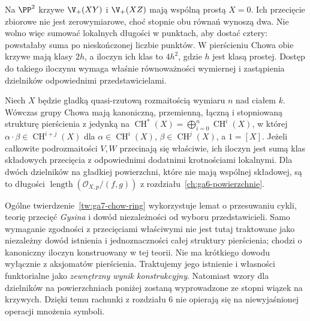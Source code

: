 \begin{przyklad}
Na $\PP^2$ krzywe $\V_+(XY)$ i $\V_+(XZ)$
mają wspólną prostą $X=0$. Ich przecięcie zbiorowe
nie jest zerowymiarowe, choć stopnie obu równań wynoszą dwa.
Nie wolno więc sumować lokalnych długości w punktach,
aby dostać cztery: powstałaby suma po nieskończonej liczbie
punktów. W pierścieniu Chowa obie krzywe mają klasy $2h$,
a iloczyn ich klas to $4h^2$, gdzie $h$ jest klasą prostej.
Dostęp do takiego iloczynu wymaga właśnie równoważności
wymiernej i zastąpienia dzielników odpowiednimi przedstawicielami.
\end{przyklad}

\begin{twierdzenie}
\label{tw:ga7-chow-ring}
Niech $X$ będzie gładką quasi-rzutową rozmaitością
wymiaru $n$ nad ciałem $k$. Wówczas grupy Chowa mają kanoniczną, przemienną,
łączną i stopniowaną strukturę pierścienia z jedynką na
$\operatorname{CH}^*(X)=\bigoplus_{i=0}^n\operatorname{CH}^i(X)$,
w której $\alpha\cdot\beta\in\operatorname{CH}^{i+j}(X)$
dla $\alpha\in\operatorname{CH}^i(X)$,
$\beta\in\operatorname{CH}^j(X)$, a $1=[X]$.
Jeżeli całkowite podrozmaitości $V,W$ przecinają się
właściwie, ich iloczyn jest sumą klas składowych
przecięcia z odpowiednimi dodatnimi krotnościami
lokalnymi. Dla dwóch dzielników na gładkiej powierzchni,
które nie mają wspólnej składowej, są to długości
$\operatorname{length}(\mathcal O_{X,p}/(f,g))$ z
rozdziału~\ref{ch:ga6-powierzchnie}.
\end{twierdzenie}

\begin{uwaga}
\label{uw:ga7-moving-lemma}
Ogólne twierdzenie~\ref{tw:ga7-chow-ring} wykorzystuje
lemat o przesuwaniu cykli, teorię przecięć \emph{Gysina}
i dowód niezależności od wyboru przedstawicieli.
Samo wymaganie zgodności z przecięciami właściwymi nie jest
tutaj traktowane jako niezależny dowód istnienia i jednoznaczności
całej struktury pierścienia; chodzi o kanoniczny iloczyn
konstruowany w tej teorii.
Nie ma krótkiego dowodu wyłącznie z aksjomatów pierścienia.
Traktujemy jego istnienie i własności funktorialne jako
\emph{zewnętrzny wynik konstrukcyjny}. Natomiast wzory dla
dzielników na powierzchniach poniżej zostaną wyprowadzone
ze stopni wiązek na krzywych. Dzięki temu
rachunki z rozdziału 6 nie opierają się na niewyjaśnionej
operacji mnożenia symboli.
\end{uwaga}

